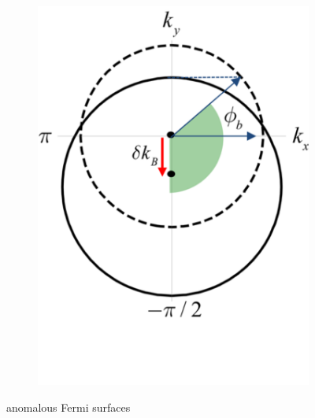 \begin{figure}[H]
\begin{subfigure}[b]{0.4\linewidth}
            \includegraphics[width = \linewidth]{fig/Chap 2/anomalous fermi surface2.png}
            \caption{}
            \label{2fig:anomalous fermi surface2}
        \end{subfigure}
    \caption{anomalous Fermi surfaces}
    \label{2fig:anomalous fermi surface}
    \end{figure}